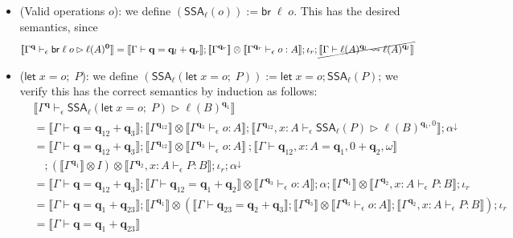 \documentclass[acmsmall,screen,anonymous,review]{acmart}
\newcommand{\mb}[1]{\ensuremath{\mathbf{#1}}}
\newcommand{\ms}[1]{\ensuremath{\mathsf{#1}}}
\newcommand{\letexpr}[3]{\ensuremath{\ms{let}\;#1 = #2;\;#3}}
\newcommand{\letstmt}[3]{\ensuremath{\ms{let}\;#1 = #2; #3}}
\newcommand{\brb}[2]{\ms{br}\;#1\;#2}
\newcommand{\qsp}[4]{#1 \vdash #2 = #3 + #4}
\newcommand{\lwk}[3]{#1 \vdash #2 \rightsquigarrow #3}
\newcommand{\hasty}[4]{#1 \vdash_{#2} #3: {#4}}
\newcommand{\haslb}[4]{#1 \vdash_{#2} #3 \rhd #4}
\newcommand{\tossa}[2]{\ms{SSA}_{#1}(#2)}
\newcommand{\dnt}[1]{\llbracket{#1}\rrbracket}
\begin{document}
\begin{itemize}
  \item (Valid operations $o$): we define
  $(\tossa{\ell}{o}) := \brb{\ell}{o}$. This has the desired semantics, since
  \begin{align*}
    \dnt{\haslb{\Gamma^{\mb{q}}}{\epsilon}{\brb{\ell}{o}}{\ell(A)^{\mb{0}}}}
    & = \dnt{\qsp{\Gamma}{\mb{q}}{\mb{q}_l}{\mb{q}_r}} 
      ; \dnt{\Gamma^{\mb{q}_r}} \otimes \dnt{\hasty{\Gamma^{\mb{q}_r}}{\epsilon}{o}{A}} 
      ; \iota_r
      ; \cancel{\dnt{\lwk{\Gamma}{\ell(A)^{\mb{q}_l}}{\ell(A)^{\mb{q}_l}}}}
  \end{align*}
  \item ($\letexpr{x}{o}{P}$): we define
  $(\tossa{\ell}{\letexpr{x}{o}{P}}) := \letstmt{x}{o}{\tossa{\ell}{P}}$; we verify this has
  the correct semantics by induction as follows:
  \begin{align*}
  & \dnt{\haslb{\Gamma^{\mb{q}}}{\epsilon}{\tossa{\ell}{\letexpr{x}{o}{P}}}{\ell(B)^{\mb{q}_1}}} \\
  & = \dnt{\qsp{\Gamma}{\mb{q}}{\mb{q}_{12}}{\mb{q}_3}} 
    ; \dnt{\Gamma^{\mb{q}_{12}}} \otimes \dnt{\hasty{\Gamma^{\mb{q}_3}}{\epsilon}{o}{A}}
    ; \dnt{\haslb{\Gamma^{\mb{q}_{12}}, x : A}{\epsilon}{\tossa{\ell}{P}}{\ell(B)^{\mb{q}_1, 0}}}
    ; \alpha^\downarrow \\
  & = \dnt{\qsp{\Gamma}{\mb{q}}{\mb{q}_{12}}{\mb{q}_3}} 
    ; \dnt{\Gamma^{\mb{q}_{12}}} \otimes \dnt{\hasty{\Gamma^{\mb{q}_3}}{\epsilon}{o}{A}}\
    ; \dnt{\qsp{\Gamma}{\mb{q}_{12}, x : A}{\mb{q}_1, 0}{\mb{q}_2, \omega}}
  \\ & \quad
    ; (\dnt{\Gamma^{\mb{q}_1}} \otimes I) \otimes 
      \dnt{\hasty{\Gamma^{\mb{q}_2}, x : A}{\epsilon}{P}{B}}
    ; \iota_r
    ; \alpha^\downarrow \\ 
  & = \dnt{\qsp{\Gamma}{\mb{q}}{\mb{q}_{12}}{\mb{q}_3}} 
    ; \dnt{\qsp{\Gamma}{\mb{q}_{12}}{\mb{q}_1}{\mb{q}_2}} 
      \otimes \dnt{\hasty{\Gamma^{\mb{q}_3}}{\epsilon}{o}{A}}
    ; \alpha
    ; \dnt{\Gamma^{\mb{q}_1}} \otimes \dnt{\hasty{\Gamma^{\mb{q}_2}, x : A}{\epsilon}{P}{B}}
    ; \iota_r \\
  & = \dnt{\qsp{\Gamma}{\mb{q}}{\mb{q}_1}{\mb{q}_{23}}}
    ; \dnt{\Gamma^{\mb{q}_1}} \otimes (
      \dnt{\qsp{\Gamma}{\mb{q}_{23}}{\mb{q}_2}{\mb{q}_3}}
      ; \dnt{\Gamma^{\mb{q}_{3}}} \otimes \dnt{\hasty{\Gamma^{\mb{q}_3}}{\epsilon}{o}{A}}
      ; \dnt{\hasty{\Gamma^{\mb{q}_2}, x : A}{\epsilon}{P}{B}}
    )
    ; \iota_r \\
  & = \dnt{\qsp{\Gamma}{\mb{q}}{\mb{q}_1}{\mb{q}_{23}}}

\end{align*}
\end{itemize}
\end{document}
